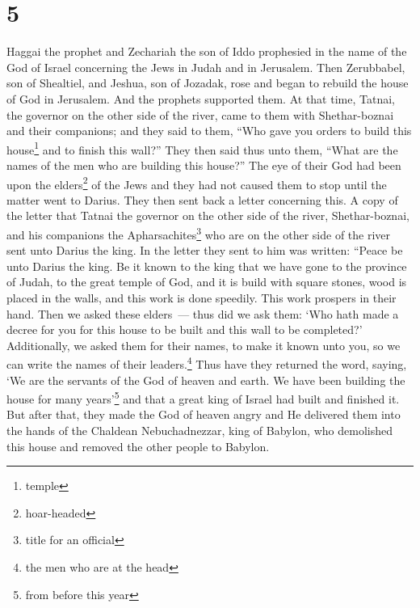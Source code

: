 \section{5}\label{Ezra 5}
\begin{enumerate}[align=center]
     Haggai the prophet and Zechariah the son of Iddo prophesied in the name of the God of Israel concerning the Jews in Judah and in Jerusalem.%
     Then Zerubbabel, son of Shealtiel, and Jeshua, son of Jozadak, rose and began to rebuild the house of God in Jerusalem. And the prophets supported them.%
     At that time, Tatnai, the governor on the other side of the river, came to them with Shethar-boznai and their companions; and they said to them, ``Who gave you orders to build this house\footnote{temple} and to finish this wall?''%
     They then said thus unto them, ``What are the names of the men who are building this house?''%
     The eye of their God had been upon the elders\footnote{hoar-headed} of the Jews and they had not caused them to stop until the matter went to Darius. They then sent back a letter concerning this.%
     A copy of the letter that Tatnai the governor on the other side of the river, Shethar-boznai, and his companions the Apharsachites\footnote{title for an official} who are on the other side of the river sent unto Darius the king.%
     In the letter they sent to him was written: ``Peace be unto Darius the king.%
     Be it known to the king that we have gone to the province of Judah, to the great temple of God, and it is build with square stones, wood is placed in the walls, and this work is done speedily. This work prospers in their hand.%
     Then we asked these elders~--- thus did we ask them: `Who hath made a decree for you for this house to be built and this wall to be completed?'%
     Additionally, we asked them for their names, to make it known unto you, so we can write the names of their leaders.\footnote{the men who are at the head}%
     Thus have they returned the word, saying, `We are the servants of the God of heaven and earth. We have been building the house for many years'\footnote{from before this year} and that a great king of Israel had built and finished it.%
     But after that, they made the God of heaven angry and He delivered them into the hands of the Chaldean Nebuchadnezzar, king of Babylon, who demolished this house and removed the other people to Babylon.%

\end{enumerate}
